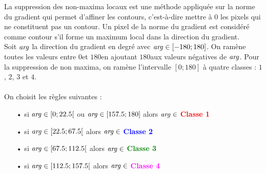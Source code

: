 La suppression des non-maxima locaux est une méthode appliquée sur la norme du gradient qui permet d'affiner les contours, c'est-à-dire mettre à 0 les pixels qui ne constituent pas un contour. Un pixel de la norme du gradient est considéré comme contour s'il forme un maximum local dans la direction du gradient. \\

Soit $ \text{\emph{arg}} $ la direction du gradient en degré avec $ \text{\emph{arg}} \in [-180; 180] $. On ramène toutes les valeurs entre $ 0 $\degre et $ 180 $\degre en ajoutant $ 180 $\degre aux valeurs négatives de $ \text{\emph{arg}} $. Pour la suppression de non maxima, on ramène l'intervalle $ [0; 180] $ à quatre classes : $ 1 $, $ 2 $, $ 3 $ et $ 4 $. \\
\\
On choisit les règles suivantes : \\
\begin{itemize}
\item[•] si $ \text{\emph{arg}} \in [0; 22.5[ $ ou $ \text{\emph{arg}} \in [157.5; 180] $ alors $ \text{\emph{arg}} \in $ \textcolor{red}{\textbf{Classe 1}}
\item[•] si $ \text{\emph{arg}} \in [22.5; 67.5[ $ alors $ \text{\emph{arg}} \in $ \textcolor{blue}{\textbf{Classe 2}}
\item[•] si $ \text{\emph{arg}} \in [67.5; 112.5[ $ alors $ \text{\emph{arg}} \in $ \textcolor{green}{\textbf{Classe 3}}
\item[•] si $ \text{\emph{arg}} \in [112.5; 157.5[ $ alors $ \text{\emph{arg}} \in $ \textcolor{magenta}{\textbf{Classe 4}}
\end{itemize}

